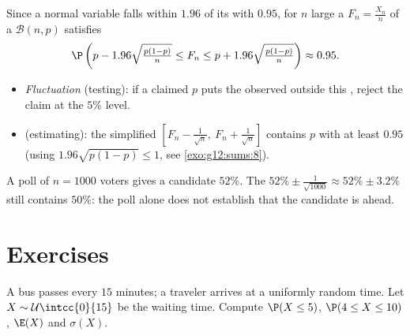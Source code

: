 \begin{method}\label{met:g12:contdist:fluctuation}
Since a normal variable falls within $1.96$  of its 
with  $0.95$, for $n$ large a 
$F_n = \frac{X_n}{n}$ of a $\mathcal B(n,p)$  satisfies
\[
\P\left(p - 1.96\sqrt{\tfrac{p(1-p)}{n}} \leq F_n \leq
p + 1.96\sqrt{\tfrac{p(1-p)}{n}}\right) \approx 0.95 .
\]
\begin{itemize}
  \item \emph{Fluctuation } (testing): if a claimed $p$ puts the
        observed  outside this , reject the claim at the
        $5\%$ level.
  \item \emph{} (estimating): the simplified 
        $\left[F_n - \frac{1}{\sqrt n},\ F_n + \frac{1}{\sqrt n}\right]$
        contains $p$ with  at least $0.95$
        (using $1.96\sqrt{p(1-p)} \leq 1$, see \cref{exo:g12:sums:8}).
\end{itemize}
\end{method}

\begin{example}\label{ex:g12:contdist:poll}
A poll of $n = 1000$ voters gives a candidate $52\%$. The  $52\% \pm \frac{1}{\sqrt{1000}} \approx 52\% \pm 3.2\%$ still
contains $50\%$: the poll alone does not establish that the candidate is
ahead.
\end{example}

\section{Exercises}

\begin{exercise}[$\star$]\label{exo:g12:contdist:1}
A bus passes every $15$ minutes; a traveler arrives at a uniformly random
time. Let $X \sim \mathcal U\intcc{0}{15}$ be the waiting time. Compute
$\P(X \leq 5)$, $\P(4 \leq X \leq 10)$, $\E(X)$ and $\sigma(X)$.
\end{exercise}


